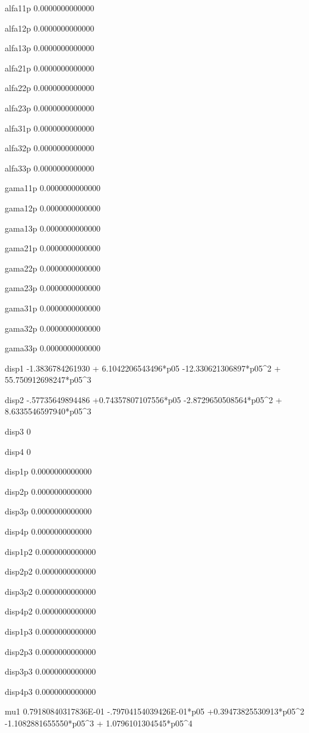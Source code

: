  alfa11p
   0.0000000000000 
  
 alfa12p
   0.0000000000000 
  
 alfa13p
   0.0000000000000 
  
 alfa21p
   0.0000000000000 
  
 alfa22p
   0.0000000000000 
  
 alfa23p
   0.0000000000000 
  
 alfa31p
   0.0000000000000 
  
 alfa32p
   0.0000000000000 
  
 alfa33p
   0.0000000000000 
  
 gama11p
   0.0000000000000 
  
 gama12p
   0.0000000000000 
  
 gama13p
   0.0000000000000 
  
 gama21p
   0.0000000000000 
  
 gama22p
   0.0000000000000 
  
 gama23p
   0.0000000000000 
  
 gama31p
   0.0000000000000 
  
 gama32p
   0.0000000000000 
  
 gama33p
   0.0000000000000 
  
 disp1  
  -1.3836784261930 + 6.1042206543496*p05  -12.330621306897*p05^2 + 55.750912698247*p05^3 
  
 disp2  
  -.57735649894486 +0.74357807107556*p05  -2.8729650508564*p05^2 + 8.6335546597940*p05^3 
  
 disp3  
 0 
  
 disp4  
 0 
  
 disp1p 
   0.0000000000000 
  
 disp2p 
   0.0000000000000 
  
 disp3p 
   0.0000000000000 
  
 disp4p 
   0.0000000000000 
  
 disp1p2
   0.0000000000000 
  
 disp2p2
   0.0000000000000 
  
 disp3p2
   0.0000000000000 
  
 disp4p2
   0.0000000000000 
  
 disp1p3
   0.0000000000000 
  
 disp2p3
   0.0000000000000 
  
 disp3p3
   0.0000000000000 
  
 disp4p3
   0.0000000000000 
  
 mu1    
  0.79180840317836E-01  -.79704154039426E-01*p05 +0.39473825530913*p05^2  -1.1082881655550*p05^3 + 1.0796101304545*p05^4 
  
